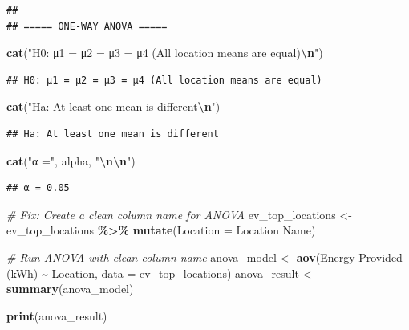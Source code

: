 \documentclass[
  12pt,
]{article}
\newenvironment{Shaded}{\begin{snugshade}}{\end{snugshade}}
\newcommand{\AttributeTok}[1]{\textcolor[rgb]{0.13,0.29,0.53}{#1}}
\newcommand{\CommentTok}[1]{\textcolor[rgb]{0.56,0.35,0.01}{\textit{#1}}}
\newcommand{\FunctionTok}[1]{\textcolor[rgb]{0.13,0.29,0.53}{\textbf{#1}}}
\newcommand{\NormalTok}[1]{#1}
\newcommand{\OtherTok}[1]{\textcolor[rgb]{0.56,0.35,0.01}{#1}}
\newcommand{\SpecialCharTok}[1]{\textcolor[rgb]{0.81,0.36,0.00}{\textbf{#1}}}
\newcommand{\StringTok}[1]{\textcolor[rgb]{0.31,0.60,0.02}{#1}}
\begin{document}
\begin{verbatim}
## 
## ===== ONE-WAY ANOVA =====
\end{verbatim}

\begin{Shaded}
\begin{Highlighting}[]
\FunctionTok{cat}\NormalTok{(}\StringTok{"H0: μ1 = μ2 = μ3 = μ4 (All location means are equal)}\SpecialCharTok{\textbackslash{}n}\StringTok{"}\NormalTok{)}
\end{Highlighting}
\end{Shaded}

\begin{verbatim}
## H0: μ1 = μ2 = μ3 = μ4 (All location means are equal)
\end{verbatim}

\begin{Shaded}
\begin{Highlighting}[]
\FunctionTok{cat}\NormalTok{(}\StringTok{"Ha: At least one mean is different}\SpecialCharTok{\textbackslash{}n}\StringTok{"}\NormalTok{)}
\end{Highlighting}
\end{Shaded}

\begin{verbatim}
## Ha: At least one mean is different
\end{verbatim}

\begin{Shaded}
\begin{Highlighting}[]
\FunctionTok{cat}\NormalTok{(}\StringTok{"α ="}\NormalTok{, alpha, }\StringTok{"}\SpecialCharTok{\textbackslash{}n\textbackslash{}n}\StringTok{"}\NormalTok{)}
\end{Highlighting}
\end{Shaded}

\begin{verbatim}
## α = 0.05
\end{verbatim}

\begin{Shaded}
\begin{Highlighting}[]
\CommentTok{\# Fix: Create a clean column name for ANOVA}
\NormalTok{ev\_top\_locations }\OtherTok{\textless{}{-}}\NormalTok{ ev\_top\_locations }\SpecialCharTok{\%\textgreater{}\%}
    \FunctionTok{mutate}\NormalTok{(}\AttributeTok{Location =} \StringTok{\textasciigrave{}}\AttributeTok{Location Name}\StringTok{\textasciigrave{}}\NormalTok{)}

\CommentTok{\# Run ANOVA with clean column name}
\NormalTok{anova\_model }\OtherTok{\textless{}{-}} \FunctionTok{aov}\NormalTok{(}\StringTok{\textasciigrave{}}\AttributeTok{Energy Provided (kWh)}\StringTok{\textasciigrave{}} \SpecialCharTok{\textasciitilde{}}\NormalTok{ Location, }\AttributeTok{data =}\NormalTok{ ev\_top\_locations)}
\NormalTok{anova\_result }\OtherTok{\textless{}{-}} \FunctionTok{summary}\NormalTok{(anova\_model)}

\FunctionTok{print}\NormalTok{(anova\_result)}
\end{Highlighting}
\end{Shaded}
\end{document}
